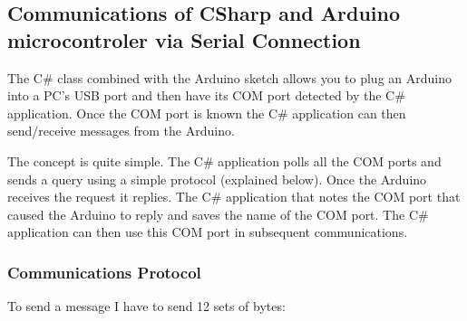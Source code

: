 \subsection{Communications of CSharp and Arduino microcontroler via Serial Connection}

The C\# class combined with the Arduino sketch allows you to plug an Arduino into a PC's USB port and then have its COM port detected by the C\# application. Once the COM port is known the C\# application can then send/receive messages from the Arduino.

The concept is quite simple. The C\# application polls all the COM ports and sends a query using a simple protocol (explained below). Once the Arduino receives the request it replies. The C\# application that notes the COM port that caused the Arduino to reply and saves the name of the COM port. The C\# application can then use this COM port in subsequent communications.

\subsubsection{Communications Protocol}

To send a message I have to send 12 sets of bytes:

